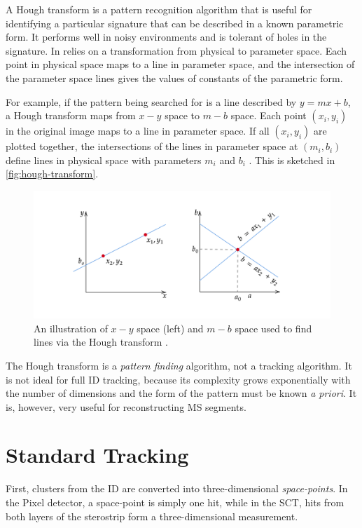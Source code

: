 A Hough transform is a pattern recognition algorithm that is useful for identifying a particular signature that can be described in a known parametric form. It performs well in noisy environments and is tolerant of holes in the signature. In relies on a transformation from physical to parameter space. Each point in physical space maps to a line in parameter space, and the intersection of the parameter space lines gives the values of constants of the parametric form. 

For example, if the pattern being searched for is a line described by $y = mx + b$, a Hough transform maps from $x-y$ space to $m-b$ space. Each point $(x_i, y_i)$ in the original image maps to a line in parameter space. If all $(x_i, y_i)$ are plotted together, the intersections of the lines in parameter space at $(m_i, b_i)$ define lines in physical space with parameters $m_i$ and $b_i$ \cite{hough-transform}. This is sketched in \autoref{fig:hough-transform}.


\begin{figure}[!h]
\centering
\includegraphics[width=.6\textwidth]{figures/EventReconstruction/hough-transform.png}
\caption{An illustration of $x-y$ space (left) and $m-b$ space used to find lines via the Hough transform \cite{hough-transform-sketch}. }
\label{fig:hough-transform}
\end{figure}



The Hough transform is a \emph{pattern finding} algorithm, not a tracking algorithm. It is not ideal for full \ac{ID} tracking, because its complexity grows exponentially with the number of dimensions and the form of the pattern must be known \emph{a priori}. It is, however, very useful for reconstructing \ac{MS} segments.



\section{Standard Tracking}

First, clusters from the \ac{ID} are converted into three-dimensional \emph{space-points}. In the Pixel detector, a space-point is simply one hit, while in the \ac{SCT}, hits from both layers of the sterostrip form a three-dimensional measurement.

